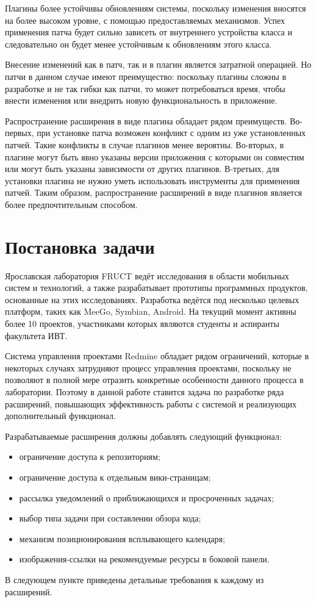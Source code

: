 Плагины более устойчивы обновлениям системы, поскольку изменения вносятся на
более высоком уровне, с помощью предоставляемых механизмов. Успех применения
патча будет сильно зависеть от внутреннего устройства класса и следовательно
он будет менее устойчивым к обновлениям этого класса.

Внесение изменений как в патч, так и в плагин является затратной операцией. Но
патчи в данном случае имеют преимущество: поскольку плагины сложны в разработке
и не так гибки как патчи, то может потребоваться время, чтобы внести изменения
или внедрить новую функциональность в приложение.

Распространение расширения в виде плагина обладает рядом преимуществ.
Во-первых, при установке патча возможен конфликт с одним из уже установленных
патчей. Такие конфликты в случае плагинов менее вероятны. Во-вторых, в плагине
могут быть явно указаны версии приложения с которыми он совместим или могут
быть указаны зависимости от других плагинов. В-третьих, для установки плагина
не нужно уметь использовать инструменты для применения патчей. Таким образом,
распространение расширений в виде плагинов является более предпочтительным
способом.

\section{Постановка задачи}

Ярославская лаборатория FRUCT \cite{yarfruct} ведёт исследования в области
мобильных систем и технологий, а также разрабатывает прототипы программных
продуктов, основанные на этих исследованиях. Разработка ведётся под несколько
целевых платформ, таких как MeeGo, Symbian, Android. На текущий момент активны
более 10 проектов, участниками которых являются студенты и аспиранты факультета
ИВТ.

Система управления проектами Redmine обладает рядом ограничений, которые в
некоторых случаях затрудняют процесс управления проектами, поскольку не
позволяют в полной мере отразить конкретные особенности данного процесса в
лаборатории. Поэтому в данной работе ставится задача по разработке ряда
расширений, повышающих эффективность работы с системой и реализующих
дополнительный функционал.

Разрабатываемые расширения должны добавлять следующий функционал:
\begin{itemize}
  \item ограничение доступа к репозиториям;
  \item ограничение доступа к отдельным вики-страницам;
  \item рассылка уведомлений о приближающихся и просроченных задачах; 
  \item выбор типа задачи при составлении обзора кода;
  \item механизм позиционирования всплывающего календаря;
  \item изображения-ссылки на рекомендуемые ресурсы в боковой панели.
\end{itemize}
В следующем пункте приведены детальные требования к каждому из расширений.

